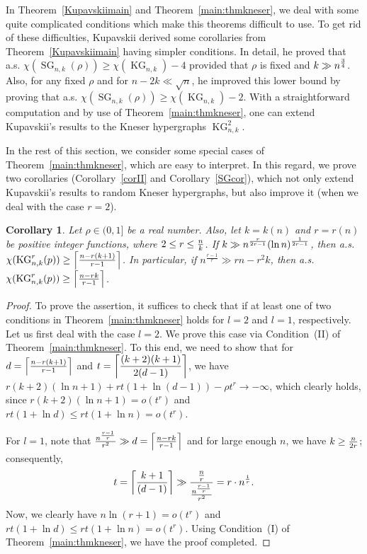 \documentclass[11pt]{amsart}
\newtheorem{corollary}{Corollary}
\theoremstyle{definition}
\theoremstyle{remark}
\def\ds{\displaystyle}
\def\KG{\operatorname{KG}}
\def\SG{\operatorname{SG}}
\begin{document}
In Theorem~\ref{Kupavskiimain} and Theorem~\ref{main:thmkneser}, we deal with some quite 
complicated conditions which make this theorems difficult to use. 
To get rid  of these difficulties, Kupavskii derived some corollaries from 
Theorem~\ref{Kupavskiimain} having  simpler conditions.  
In detail, he proved that a.s. $\chi(\SG_{n,k}(\rho))\geq \chi(\KG_{n,k})-4$ 
provided that $\rho$ is fixed and $k\gg n^{3\over 4}$. 
Also, for any fixed $\rho$ and for $n-2k\ll \sqrt{n}$, he improved this lower 
bound by proving that a.s.  $\chi(\SG_{n,k}(\rho))\geq \chi(\KG_{n,k})-2$.
With a straightforward computation and by use of Theorem~\ref{main:thmkneser}, one can extend Kupavskii's results to the Kneser hypergraphs $\KG^2_{n,k}$. 

In the rest of this section, we consider 
some special cases of Theorem~\ref{main:thmkneser}, which are easy to interpret.
In this regard, we prove two corollaries (Corollary~\ref{corII} and Corollary~\ref{SGcor}), which not only extend 
Kupavskii's results  to random Kneser hypergraphs, but also improve it 
(when we deal with the case $r=2$).
\begin{corollary}\label{2main:cor}
Let $\rho\in(0,1]$ be a real number. Also, let $k=k(n)$ and $r=r(n)$ be positive integer functions, where $2\leq r \leq {n\over k}$.
If $k\gg n^{r\over 2r-1}(\ln n)^{1\over 2r-1}$, then a.s. 
$\chi(\KG^r_{n,k}(p))\geq \left\lceil{n-r(k+1)\over r-1}\right\rceil$. In particular, if $n^{\frac{r-1}{r}}\gg rn-r^2k $, then a.s. 
$\chi(\KG^r_{n,k}(p))\geq \left\lceil{n-rk\over r-1}\right\rceil$.
\end{corollary}
\begin{proof}
To prove the assertion, it suffices to check that if at least one of two conditions in 
Theorem~\ref{main:thmkneser}
holds for $l=2$ and $l=1$, respectively.
Let us first deal with the case $l=2$. We prove this case via Condition~(II) of 
Theorem~\ref{main:thmkneser}. To this end, 
we need to show that for
$d= \left\lceil{n-r(k+1)\over r-1}\right\rceil$ and 
$t=\ds\left\lceil{(k+2)(k+1)\over 2(d-1)}\right\rceil$, we have 
$r(k+2)(\ln n+1) +rt(1+\ln (d-1))-\rho t^r\rightarrow -\infty$, which clearly holds, 
since
$r(k+2)(\ln n+1)=o(t^r)$ and $rt(1+\ln d)\leq rt(1+\ln n)=o(t^r)$.

For $l=1$, note that ${n^{\frac{r-1}{r}}\over r^2}\gg d= \left\lceil{n-rk\over r-1}\right\rceil$ and for large enough $n$, we have 
$k\geq {n\over 2r}$; consequently, 
$$t=\ds\left\lceil{k+1\over (d-1)}\right\rceil\gg
{{n\over r}\over {n^{\frac{r-1}{r}}\over r^2}}=r\cdot n^{1\over r}.
$$
Now, we clearly have $n\ln(r+1)=o(t^r)$ and $rt(1+\ln d)\leq rt(1+\ln n)=o(t^r)$. 
 Using Condition~(I) of Theorem~\ref{main:thmkneser}, we have the proof completed.
\end{proof}
\end{document}
